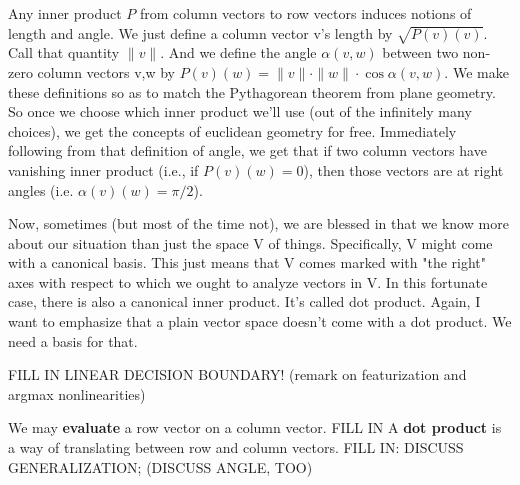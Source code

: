 \documentclass[11pt, justified]{tufte-book}
\newcommand{\attnsam}[1]{{\red \textsf{#1}}}
\theoremstyle{definition}
\begin{document}
        Any inner product $P$ from column vectors to row vectors induces notions
        of length and angle.  We just define a column vector v's length by
        $\sqrt{P(v)(v)}$.  Call that quantity $\|v\|$.  And we define the angle
        $\alpha(v,w)$ between two non-zero column vectors v,w by
        $P(v)(w)=\|v\|\cdot\|w\|\cdot\cos\alpha(v,w)$.  We make these
        definitions so as to match the Pythagorean theorem from plane geometry.
        So once we choose which inner product we'll use (out of the infinitely
        many choices), we get the concepts of euclidean geometry for free.
        Immediately following from that definition of angle, we get that if two
        column vectors have vanishing inner product (i.e., if $P(v)(w)=0$), then
        those vectors are at right angles (i.e. $\alpha(v)(w)=\pi/2$).
        
        Now, sometimes (but most of the time not), we are blessed in
        that we know more about our situation than just the space V of things.
        Specifically, V might come with a canonical basis.  This just means
        that V comes marked with "the right" axes with respect to which we
        ought to analyze vectors in V.  In this fortunate case, there is also a
        canonical inner product.  It's called dot product.  Again, I want to
        emphasize that a plain vector space doesn't come with a dot product.
        We need a basis for that.


        \attnsam{FILL IN LINEAR DECISION BOUNDARY! (remark on featurization and
        argmax nonlinearities)}

        We may \textbf{evaluate} a row vector on a column vector.  \attnsam{FILL
        IN} A \textbf{dot product} is a way of translating between row and
        column vectors.  \attnsam{FILL IN: DISCUSS GENERALIZATION; (DISCUSS ANGLE, TOO)}
\end{document}
